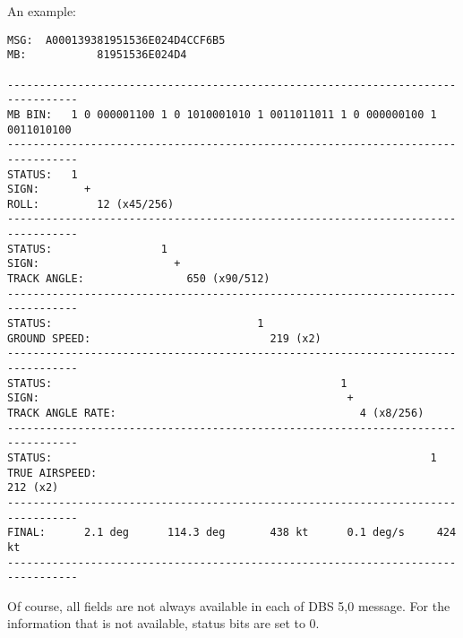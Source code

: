 An example:

\begin{verbatim}
MSG:  A000139381951536E024D4CCF6B5
MB:           81951536E024D4

---------------------------------------------------------------------------------
MB BIN:   1 0 000001100 1 0 1010001010 1 0011011011 1 0 000000100 1 0011010100
---------------------------------------------------------------------------------
STATUS:   1
SIGN:       +
ROLL:         12 (x45/256)
---------------------------------------------------------------------------------
STATUS:                 1
SIGN:                     +
TRACK ANGLE:                650 (x90/512)
---------------------------------------------------------------------------------
STATUS:                                1
GROUND SPEED:                            219 (x2)
---------------------------------------------------------------------------------
STATUS:                                             1
SIGN:                                                +
TRACK ANGLE RATE:                                      4 (x8/256)
---------------------------------------------------------------------------------
STATUS:                                                           1
TRUE AIRSPEED:                                                      212 (x2)
---------------------------------------------------------------------------------
FINAL:      2.1 deg      114.3 deg       438 kt      0.1 deg/s     424 kt
---------------------------------------------------------------------------------
\end{verbatim}

Of course, all fields are not always available in each of DBS 5,0
message. For the information that is not available, status bits are set
to 0.

